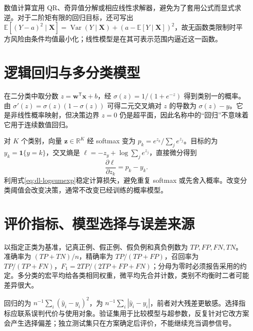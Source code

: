 \documentclass[UTF8,12pt,a4paper,fontset=fandol]{ctexbook}
\begin{document}
数值计算宜用 QR、奇异值分解或相应线性求解器，避免为了套用公式而显式求逆。对于二阶矩有限的回归目标，还可写出 $\mathbb E[(Y-a)^2\mid\mathbf X]=\operatorname{Var}(Y\mid\mathbf X)+(a-\mathbb E[Y\mid\mathbf X])^2$，故无函数类限制时平方风险由条件均值最小化；线性模型是在其可表示范围内逼近这一函数。

\section{逻辑回归与多分类模型}
在二分类中取分数 $z=\mathbf w^\mathsf T\mathbf x+b$，经 $\sigma(z)=1/(1+e^{-z})$ 得到类别一的概率。由 $\sigma'(z)=\sigma(z)(1-\sigma(z))$ 可得二元交叉熵对 $z$ 的导数为 $\sigma(z)-y$。它是非线性概率映射，但决策边界 $z=0$ 仍是超平面，因此名称中的“回归”不意味着它用于连续数值回归。

对 $K$ 个类别，向量 $\mathbf z\in\mathbb R^K$ 经 softmax 变为 $p_k=e^{z_k}/\sum_je^{z_j}$。目标的为 $y_k=\mathbf1\{y=k\}$，交叉熵是 $\ell=-z_y+\log\sum_je^{z_j}$，直接微分得到
\begin{equation}
\frac{\partial\ell}{\partial z_k}=p_k-y_k.
\label{eq:dl-softmax-gradient}
\end{equation}
利用式\eqref{eq:dl-logsumexp}稳定计算损失，避免重复 softmax 或先舍入概率。改变分类阈值会改变决策，通常不改变已经训练的概率模型。

\section{评价指标、模型选择与误差来源}
以指定正类为基准，记真正例、假正例、假负例和真负例数为 $TP,FP,FN,TN$。准确率为 $(TP+TN)/n$，精确率为 $TP/(TP+FP)$，召回率为 $TP/(TP+FN)$，$F_1=2TP/(2TP+FP+FN)$；分母为零时必须报告采用的约定。多分类的宏平均给各类相同权重，微平均先合并计数，类别不均衡时二者可能差异很大。

回归的为 $n^{-1}\sum_i(\widehat y_i-y_i)^2$，为 $n^{-1}\sum_i|\widehat y_i-y_i|$，前者对大残差更敏感。选择指标应联系误判代价与使用对象。验证集用于比较模型与超参数，反复针对它改方案会产生选择偏差；独立测试集只在方案确定后评价，不能继续充当调参信号。
\end{document}

